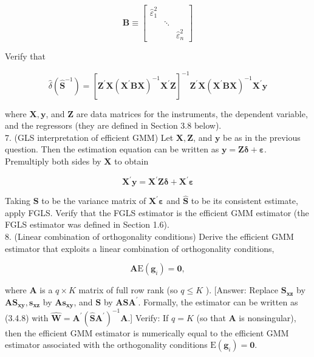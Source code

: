 \documentclass[10pt]{article}
\begin{document}
$$
\mathbf{B} \equiv\left[\begin{array}{ccc}
\hat{\varepsilon}_{1}^{2} & & \\
& \ddots & \\
& & \hat{\varepsilon}_{n}^{2}
\end{array}\right]
$$

Verify that

$$
\hat{\delta}\left(\widehat{\mathbf{S}}^{-1}\right)=\left[\mathbf{Z}^{\prime} \mathbf{X}\left(\mathbf{X}^{\prime} \mathbf{B X}\right)^{-1} \mathbf{X}^{\prime} \mathbf{Z}\right]^{-1} \mathbf{Z}^{\prime} \mathbf{X}\left(\mathbf{X}^{\prime} \mathbf{B X}\right)^{-1} \mathbf{X}^{\prime} \mathbf{y}
$$

where $\mathbf{X}, \mathbf{y}$, and $\mathbf{Z}$ are data matrices for the instruments, the dependent variable, and the regressors (they are defined in Section 3.8 below).\\
7. (GLS interpretation of efficient GMM) Let $\mathbf{X}, \mathbf{Z}$, and $\mathbf{y}$ be as in the previous question. Then the estimation equation can be written as $\mathbf{y}=\mathbf{Z} \boldsymbol{\delta}+\boldsymbol{\varepsilon}$. Premultiply both sides by $\mathbf{X}$ to obtain

$$
\mathbf{X}^{\prime} \mathbf{y}=\mathbf{X}^{\prime} \mathbf{Z} \boldsymbol{\delta}+\mathbf{X}^{\prime} \boldsymbol{\varepsilon}
$$

Taking $\mathbf{S}$ to be the variance matrix of $\mathbf{X}^{\prime} \boldsymbol{\varepsilon}$ and $\widehat{\mathbf{S}}$ to be its consistent estimate, apply FGLS. Verify that the FGLS estimator is the efficient GMM estimator (the FGLS estimator was defined in Section 1.6).\\
8. (Linear combination of orthogonality conditions) Derive the efficient GMM estimator that exploits a linear combination of orthogonality conditions,

$$
\mathbf{A} \mathrm{E}\left(\mathbf{g}_{i}\right)=\mathbf{0},
$$

where $\mathbf{A}$ is a $q \times K$ matrix of full row rank (so $q \leq K$ ). [Answer: Replace $\mathbf{S}_{\mathbf{x z}}$ by $\mathbf{A S}_{\mathbf{x y}}, \mathbf{s}_{\mathbf{x z}}$ by $\mathbf{A s}_{\mathbf{x y}}$, and $\mathbf{S}$ by $\mathbf{A S A}^{\prime}$. Formally, the estimator can be written as (3.4.8) with $\widehat{\mathbf{W}}=\mathbf{A}^{\prime}\left(\widehat{\mathbf{S}} \mathbf{A}^{\prime}\right)^{-1} \mathbf{A}$.] Verify: If $q=K$ (so that $\mathbf{A}$ is nonsingular), then the efficient GMM estimator is numerically equal to the efficient GMM estimator associated with the orthogonality conditions $\mathrm{E}\left(\mathbf{g}_{i}\right)=\mathbf{0}$.
\end{document}
